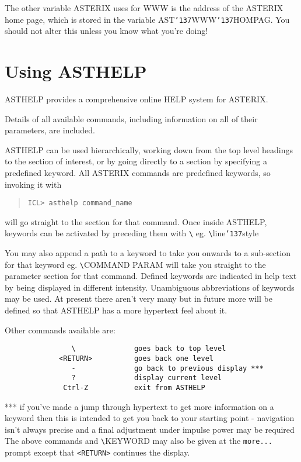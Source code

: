 \documentclass{book}
\renewcommand{\_}{{\tt\char'137}}     %
\begin{document}
The other variable ASTERIX uses for WWW is the address of the
ASTERIX home page, which is stored in the variable AST\_WWW\_HOMPAG.
You should not alter this unless you know what you're doing!

\chapter{Using ASTHELP}
ASTHELP provides a comprehensive online HELP system for ASTERIX.

Details of all available commands, including information on all
of their parameters, are included.

ASTHELP can be used hierarchically, working down from the
top level headings to the section of interest, or by going
directly to a section by specifying a predefined keyword.
All ASTERIX commands are predefined keywords, so invoking it
with

\begin{quote}\begin{verbatim}
ICL> asthelp command_name
\end{verbatim}\end{quote}
will go straight to the section for that command. Once inside
ASTHELP, keywords can be activated by preceding them with \verb+\+
eg. \verb+\+line\_style

You may also append a path to a keyword to take you onwards
to a sub-section for that keyword eg. \verb+\+COMMAND PARAM will
take you straight to the parameter section for that command.
Defined keywords are indicated in help text by being displayed
in different intensity. Unambiguous abbreviations of keywords
may be used. At present there aren't very many but in future
more will be defined so that ASTHELP has a more hypertext feel
about it.

Other commands available are:

\begin{verbatim}
                \              goes back to top level
             <RETURN>          goes back one level
                -              go back to previous display ***
                ?              display current level
              Ctrl-Z           exit from ASTHELP
\end{verbatim}
*** if you've made a jump through hypertext to get more
information on a keyword then this is intended to
get you back to your starting point - navigation
isn't always precise and a final adjustment under
impulse power may be required
The above commands and \verb+\+KEYWORD may also be given at the
{\tt more...} prompt except that \verb+<RETURN>+ continues the display.
\end{document}
